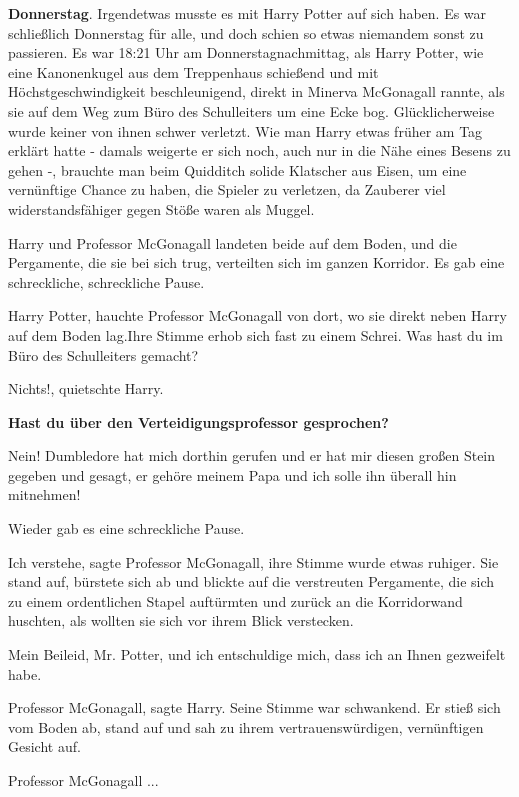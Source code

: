 \textbf{Donnerstag}. Irgendetwas musste es mit Harry Potter auf sich haben. Es
war schließlich Donnerstag für alle, und doch schien so etwas niemandem sonst zu
passieren. Es war 18:21 Uhr am Donnerstagnachmittag, als Harry Potter, wie eine
Kanonenkugel aus dem Treppenhaus schießend und mit Höchstgeschwindigkeit
beschleunigend, direkt in Minerva McGonagall rannte, als sie auf dem Weg zum
Büro des Schulleiters um eine Ecke bog. Glücklicherweise wurde keiner von ihnen
schwer verletzt. Wie man Harry etwas früher am Tag erklärt hatte - damals
weigerte er sich noch, auch nur in die Nähe eines Besens zu gehen -, brauchte
man beim Quidditch solide Klatscher aus Eisen, um eine vernünftige Chance zu
haben, die Spieler zu verletzen, da Zauberer viel widerstandsfähiger gegen Stöße
waren als Muggel.

Harry und Professor McGonagall landeten beide auf dem Boden, und die Pergamente,
die sie bei sich trug, verteilten sich im ganzen Korridor. Es gab eine
schreckliche, schreckliche Pause.

\glqq{}Harry Potter\grqq{}, hauchte Professor McGonagall von dort, wo sie direkt
neben Harry auf dem Boden lag.Ihre Stimme erhob sich fast zu einem Schrei. \glqq{}
Was hast du im Büro des Schulleiters gemacht?\grqq{}

\glqq{}Nichts!\grqq{}, quietschte Harry.

\textbf{\glqq{}Hast du über den Verteidigungsprofessor gesprochen?\grqq{}}

\glqq{}Nein! Dumbledore hat mich dorthin gerufen und er hat mir diesen großen
Stein gegeben und gesagt, er gehöre meinem Papa und ich solle ihn überall hin
mitnehmen!\grqq{}

Wieder gab es eine schreckliche Pause.

\glqq{}Ich verstehe\grqq{}, sagte Professor McGonagall, ihre Stimme wurde etwas
ruhiger. Sie stand auf, bürstete sich ab und blickte auf die verstreuten
Pergamente, die sich zu einem ordentlichen Stapel auftürmten und zurück an die
Korridorwand huschten, als wollten sie sich vor ihrem Blick verstecken.

\glqq{}Mein Beileid, Mr. Potter, und ich entschuldige mich, dass ich an Ihnen
gezweifelt habe.\grqq{}

\glqq{}Professor McGonagall\grqq{}, sagte Harry. Seine Stimme war schwankend. Er
stieß sich vom Boden ab, stand auf und sah zu ihrem vertrauenswürdigen,
vernünftigen Gesicht auf.

\glqq{}Professor McGonagall ...\grqq{}

